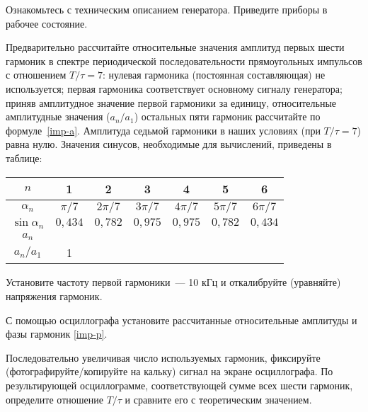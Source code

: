 \begin{lab:task}



	\item Ознакомьтесь с техническим описанием генератора. Приведите
приборы в рабочее состояние.

\item Предварительно рассчитайте относительные значения амплитуд первых шести
гармоник в спектре периодической последовательности прямоугольных импульсов с
отношением $T/\tau=7$: нулевая гармоника (постоянная составляющая) не
используется; первая гармоника соответствует основному сигналу генератора;
приняв амплитудное значение первой гармоники за единицу, относительные
амплитудные значения ($a_n/a_1$) остальных пяти гармоник рассчитайте 
по формуле~\eqref{imp-a}. Амплитуда седьмой гармоники в наших условиях (при
$T/\tau=7$) равна нулю. Значения синусов, необходимые для вычислений, приведены
в таблице:
\begin{center}
\begin{tabular}{|c|c|c|c|c|c|c|} \hline
$n$ & 1 & 2 & 3 & 4 & 5 & 6 \\ \hline $\alpha_n$&$\pi /7$&$2\pi /7$&$3\pi
/7$&$4\pi /7$&$5\pi /7$& $6\pi /7$ \\ \hline
$\sin \alpha_n$ & $0{,}434$ & $0{,}782$ & $0{,}975$ & $0{,}975$ &$0{,}782$ &
$0{,}434$ \\ \hline $a_n$ & & & & & & \\ \hline $a_n/a_1$ &1& & & & & \\ \hline
\end{tabular}
\end{center}

	\item Установите частоту первой гармоники~--- 10 кГц и
откалибруйте (уравняйте) напряжения гармоник.
	\item С помощью осциллографа установите рассчитанные относительные амплитуды
и фазы гармоник \eqref{imp-p}.
	\item Последовательно увеличивая число используемых гармоник, фиксируйте
(фотографируйте/копируйте на кальку) сигнал на экране осциллографа. По
результирующей осциллограмме, соответствующей сумме всех шести гармоник,
определите отношение $T/\tau$ и сравните его с теоретическим значением.


\end{lab:task}
